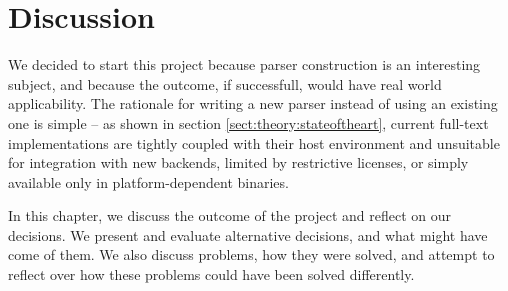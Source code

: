 \chapter{Discussion}
\label{chapter:discussion}
We decided to start this project because parser construction is an interesting
subject, and because the outcome, if successfull, would have real world
applicability. The rationale for writing a new parser instead of using an
existing one is simple -- as shown in section \ref{sect:theory:stateoftheart},
current full-text implementations are tightly coupled with their
host environment and unsuitable for integration with new backends, limited by
restrictive licenses, or simply available only in platform-dependent binaries. 

In this chapter, we discuss the outcome of the project and reflect on
our decisions. We present and evaluate alternative decisions, and what
might have come of them. We also discuss problems, how they were
solved, and attempt to reflect over how these problems could have been solved
differently.






















